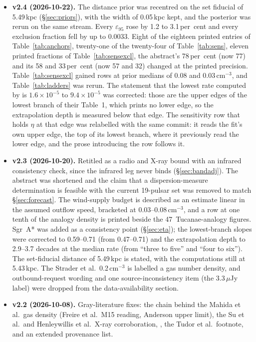\documentclass[11pt]{article}
\newcommand{\epsl}{\ensuremath{\varepsilon_{95}}}
\begin{document}
\begin{itemize}
\item \textbf{v2.4 (2026-10-22).} The distance prior was recentred on the set fiducial of 5.49\,kpc (\S\ref{sec:priors}), with the width of 0.05\,kpc kept, and the posterior was rerun on the same stream. Every \epsl{} rose by 1.2 to 3.1\,per~cent and every exclusion fraction fell by up to 0.0033. Eight of the eighteen printed entries of Table~\ref{tab:anchors}, twenty-one of the twenty-four of Table~\ref{tab:sens}, eleven printed fractions of Table~\ref{tab:sensexcl}, the abstract's 78\,per~cent (now 77) and its 58 and 33\,per~cent (now 57 and 32) changed at the printed precision. Table~\ref{tab:sensexcl} gained rows at prior medians of 0.08 and 0.03\,$\mathrm{cm^{-3}}$, and Table~\ref{tab:ladders} was rerun. The statement that the lowest rate computed by \citet{XieYuan2012} is $1.6\times10^{-5}$ to $9.4\times10^{-5}$ was corrected: those are the upper edges of the lowest branch of their Table~1, which prints no lower edge, so the extrapolation depth is measured below that edge. The sensitivity row that holds $\eta$ at that edge was relabelled with the same commit: it reads the fit's own upper edge, the top of its lowest branch, where it previously read the lower edge, and the prose introducing the row follows it.
\item \textbf{v2.3 (2026-10-20).} Retitled as a radio and X-ray bound with an infrared consistency check, since the infrared leg never binds (\S\ref{sec:bandadj}). The abstract was shortened and the claim that a dispersion-measure determination is feasible with the current 19-pulsar set was removed to match \S\ref{sec:forecast}. The wind-supply budget is described as an estimate linear in the assumed outflow speed, bracketed at 0.03--0.08\,$\mathrm{cm^{-3}}$, and a row at one tenth of the analogy density is printed beside the 47~Tucanae-analogy figures. Sgr~A* was added as a consistency point (\S\ref{sec:eta}); the lowest-branch slopes were corrected to 0.59--0.71 (from 0.47--0.71) and the extrapolation depth to 2.9--3.7 decades at the median rate (from ``three to five'' and ``four to six''). The set-fiducial distance of 5.49\,kpc is stated, with the computations still at 5.43\,kpc. The Strader et al.\ 0.2\,$\mathrm{cm^{-3}}$ is labelled a gas number density, and outbound-request wording and one source-inconsistency item (the 3.3\,$\mu$Jy label) were dropped from the data-availability section.
\item \textbf{v2.2 (2026-10-08).} Gray-literature fixes: the chain behind the Mahida et al.\ gas density (Freire et al.\ M15 reading, Anderson upper limit), the Su et al.\ and Henleywillis et al.\ X-ray corroboration, \citet{Abbassi2026}, the Tudor et al.\ footnote, and an extended provenance list.

\end{itemize}
\end{document}
